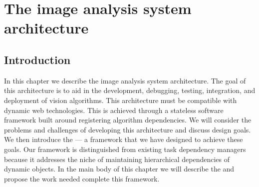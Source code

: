 \begin{comment}
    ./texfix.py --reformat --fpaths chapter5-systemchapter.tex --numlines=1
    ./texfix.py --fpaths chapter5-systemchapter.tex --outline --numlines=1 --section Examples
    ./texfix.py --fpaths chapter5-systemchapter.tex --outline --asmarkdown --numlines=99  --section Examples
    ./texfix.py --fpaths chapter5-systemchapter.tex --outline --asmarkdown --numlines=99 
\end{comment}

\chapter{The image analysis system architecture}\label{chap:system}


\section{Introduction}\label{sec:systemintro}
    In this chapter we describe the \IBEIS{} image analysis system
      architecture.
    The goal of this architecture is to aid in the development, debugging,
      testing, integration, and deployment of vision algorithms.
    This architecture must be compatible with dynamic web technologies.
    This is achieved through a stateless software framework built around
      registering algorithm dependencies.
    We will consider the problems and challenges of developing this
      architecture and discuss design goals.
    We then introduce the \glossterm{\depcache{}} --- a framework that we have
      designed to achieve these goals.
    Our framework is distinguished from existing task dependency
      managers~\cite{bernhardsson_luigi_2016} because it addresses the niche of
      maintaining hierarchical dependencies of dynamic objects.
    In the main body of this chapter we will describe the \depcache{} and
      propose the work needed complete this framework.

